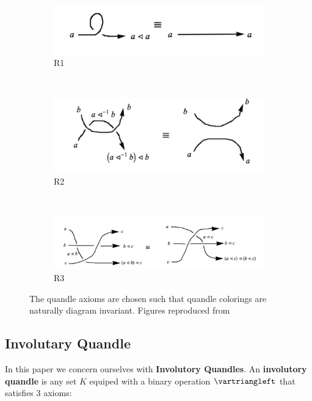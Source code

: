 \documentclass[paper.tex]{subfiles}
\begin{document}
\begin{figure}[h]
    \centering
    \begin{subfigure}[b]{0.3\textwidth}
        \includegraphics[width=\textwidth]{figures/R1}
        \caption{R1}
    \end{subfigure}
    ~ %
    \begin{subfigure}[b]{0.3\textwidth}
        \includegraphics[width=\textwidth]{figures/R2}
        \caption{R2}
    \end{subfigure}
    ~ %
    \begin{subfigure}[b]{0.3\textwidth}
        \includegraphics[width=\textwidth]{figures/R3}
        \caption{R3}
    \end{subfigure}
    \caption{The quandle axioms are chosen such that quandle colorings are naturally diagram invariant. Figures reproduced from~\cite{Cusick}}\label{fig:quandle_axioms}
\end{figure}


\subsection{Involutary Quandle}
In this paper we concern ourselves with \textbf{Involutory Quandles}. An \textbf{involutory quandle} is any set $K$ equiped with a binary operation $\uc$ that satisfies $3$ axioms:
\end{document}
